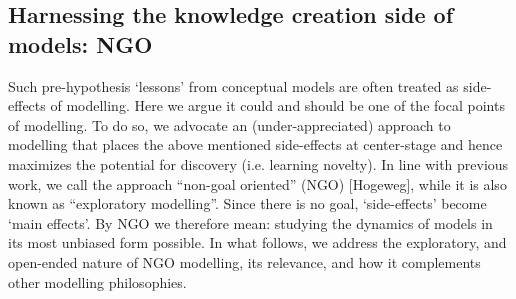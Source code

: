 \subsection{Harnessing the knowledge creation side of models: NGO}

Such pre-hypothesis `lessons' from conceptual models are often treated as side-effects of modelling.  Here we argue it could and should be one of the focal points of modelling. To do so, we advocate an (under-appreciated) approach to modelling that places the above mentioned side-effects at center-stage and hence maximizes the potential for discovery (i.e. learning novelty). In line with previous work, we call the approach ``non-goal oriented'' (NGO) [Hogeweg], while it is also known as ``exploratory modelling''. Since there is no goal, `side-effects' become `main effects'.  By NGO we therefore mean: studying the dynamics of models in its most unbiased form possible. In what follows, we address the exploratory, and open-ended nature of NGO modelling, its relevance, and how it complements other modelling philosophies.

  